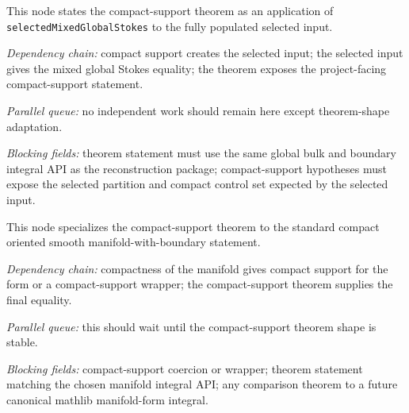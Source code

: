 \begin{theorem}
  \label{obl:m7_compact_support_from_selected_input}
  This node states the compact-support theorem as an application of
  \texttt{selectedMixedGlobalStokes} to the fully populated selected input.

  \emph{Dependency chain:}
  compact support creates the selected input; the selected input gives the mixed
  global Stokes equality; the theorem exposes the project-facing compact-support
  statement.

  \emph{Parallel queue:}
  no independent work should remain here except theorem-shape adaptation.

  \emph{Blocking fields:}
  theorem statement must use the same global bulk and boundary integral API as
  the reconstruction package; compact-support hypotheses must expose the
  selected partition and compact control set expected by the selected input.
\end{theorem}

\begin{theorem}
  \label{obl:m7_compact_manifold_specialization}
  This node specializes the compact-support theorem to the standard compact
  oriented smooth manifold-with-boundary statement.

  \emph{Dependency chain:}
  compactness of the manifold gives compact support for the form or a
  compact-support wrapper; the compact-support theorem supplies the final
  equality.

  \emph{Parallel queue:}
  this should wait until the compact-support theorem shape is stable.

  \emph{Blocking fields:}
  compact-support coercion or wrapper; theorem statement matching the chosen
  manifold integral API; any comparison theorem to a future canonical mathlib
  manifold-form integral.
\end{theorem}

